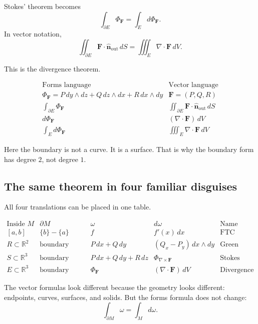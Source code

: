 Stokes' theorem becomes
\[
    \int_{\partial E}\Phi_{\mathbf F}=\int_E d\Phi_{\mathbf F}.
\]
In vector notation,
\[
\boxed{
    \iint_{\partial E}\mathbf F\cdot\widehat{\mathbf n}_{\mathrm{out}}\,dS
    =
    \iiint_E\nabla\cdot\mathbf F\,dV.
}
\]

This is the divergence theorem.

\[
\begin{array}{c|c}
\text{Forms language} & \text{Vector language} \\ \hline
\Phi_{\mathbf F}=P\,dy\wedge dz+Q\,dz\wedge dx+R\,dx\wedge dy
& \mathbf F=(P,Q,R)\\[2mm]
\displaystyle\int_{\partial E}\Phi_{\mathbf F}
& \displaystyle\iint_{\partial E}\mathbf F\cdot\widehat{\mathbf n}_{\mathrm{out}}\,dS\\[3mm]
d\Phi_{\mathbf F}
& (\nabla\cdot\mathbf F)\,dV\\[1mm]
\displaystyle\int_Ed\Phi_{\mathbf F}
& \displaystyle\iiint_E\nabla\cdot\mathbf F\,dV
\end{array}
\]

Here the boundary is not a curve.  It is a surface.  That is why the boundary form has
degree \(2\), not degree \(1\).

\subsection{The same theorem in four familiar disguises}

All four translations can be placed in one table.

\[
\begin{array}{c|c|c|c|c}
\text{Inside }M & \partial M & \omega & d\omega & \text{Name} \\ \hline
[a,b] &
\{b\}-\{a\} &
f &
f'(x)\,dx &
\text{FTC}
\\[2mm]
R\subset\mathbb R^2 &
\text{boundary curve} &
P\,dx+Q\,dy &
(Q_x-P_y)\,dx\wedge dy &
\text{Green}
\\[2mm]
S\subset\mathbb R^3 &
\text{boundary curve} &
P\,dx+Q\,dy+R\,dz &
\Phi_{\nabla\times\mathbf F} &
\text{Stokes}
\\[2mm]
E\subset\mathbb R^3 &
\text{boundary surface} &
\Phi_{\mathbf F} &
(\nabla\cdot\mathbf F)\,dV &
\text{Divergence}
\end{array}
\]

The vector formulas look different because the geometry looks different:
endpoints, curves, surfaces, and solids.  But the forms formula does not change:
\[
\boxed{
    \int_{\partial M}\omega=\int_M d\omega.
}
\]

